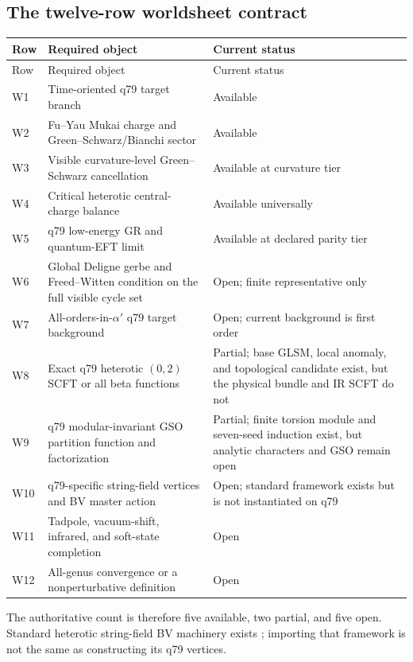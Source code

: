 \documentclass[11pt]{article}
\begin{document}
\subsection{The twelve-row worldsheet contract}

\small
\begin{longtable}{@{}p{}p{}p{}@{}}
\toprule
Row & Required object & Current status\\
\midrule
\endfirsthead
\toprule
Row & Required object & Current status\\
\midrule
\endhead
W1 & Time-oriented q79 target branch & Available\\
W2 & Fu--Yau Mukai charge and Green--Schwarz/Bianchi sector & Available\\
W3 & Visible curvature-level Green--Schwarz cancellation & Available at
curvature tier\\
W4 & Critical heterotic central-charge balance & Available universally\\
W5 & q79 low-energy GR and quantum-EFT limit & Available at declared parity
tier\\
W6 & Global Deligne gerbe and Freed--Witten condition on the full visible
cycle set & Open; finite representative only\\
W7 & All-orders-in-\(\alpha'\) q79 target background & Open; current
background is first order\\
W8 & Exact q79 heterotic \((0,2)\) SCFT or all beta functions & Partial;
base GLSM, local anomaly, and topological candidate exist, but the physical
bundle and IR SCFT do not\\
W9 & q79 modular-invariant GSO partition function and factorization &
Partial; finite torsion module and seven-seed induction exist, but analytic
characters and GSO remain open\\
W10 & q79-specific string-field vertices and BV master action & Open;
standard framework exists but is not instantiated on q79\\
W11 & Tadpole, vacuum-shift, infrared, and soft-state completion & Open\\
W12 & All-genus convergence or a nonperturbative definition & Open\\
\bottomrule
\end{longtable}
\normalsize

The authoritative count is therefore five available, two partial, and five
open. Standard heterotic string-field BV machinery exists
\cite{Sen2016}; importing that framework is not the same as constructing its
q79 vertices.
\end{document}
